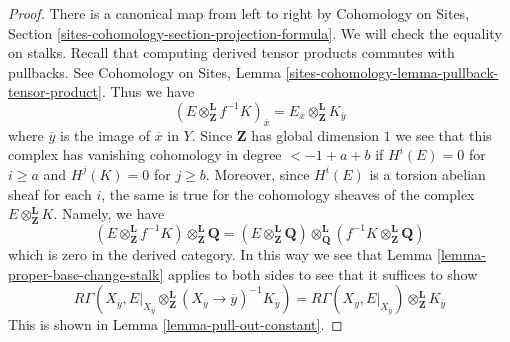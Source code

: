 \documentclass[10pt,a4paper]{amsart}
\theoremstyle{plain}
\theoremstyle{definition}
\theoremstyle{remark}
\numberwithin{equation}{subsection}
\begin{document}
\begin{proof}
There is a canonical map from left to right by
Cohomology on Sites, Section \ref{sites-cohomology-section-projection-formula}.
We will check the equality on stalks.
Recall that computing derived tensor products commutes with pullbacks.
See Cohomology on Sites, Lemma
\ref{sites-cohomology-lemma-pullback-tensor-product}.
Thus we have
$$
(E \otimes_\mathbf{Z}^\mathbf{L} f^{-1}K)_{\overline{x}}
=
E_{\overline{x}} \otimes_\mathbf{Z}^\mathbf{L} K_{\overline{y}}
$$
where $\overline{y}$ is the image of $\overline{x}$ in $Y$.
Since $\mathbf{Z}$ has global dimension $1$ we see that
this complex has vanishing cohomology in degree $< - 1 + a + b$
if $H^i(E) = 0$ for $i \geq a$ and $H^j(K) = 0$ for $j \geq b$.
Moreover, since $H^i(E)$ is a torsion abelian
sheaf for each $i$, the same is true for the cohomology
sheaves of the complex $E \otimes_\mathbf{Z}^\mathbf{L} K$.
Namely, we have
$$
(E \otimes_\mathbf{Z}^\mathbf{L} f^{-1}K)
\otimes_{\mathbf{Z}}^\mathbf{L} \mathbf{Q} =
(E \otimes_\mathbf{Z}^\mathbf{L} \mathbf{Q})
\otimes_{\mathbf{Q}}^\mathbf{L}
(f^{-1}K \otimes_{\mathbf{Z}}^\mathbf{L} \mathbf{Q})
$$
which is zero in the derived category.
In this way we see that Lemma \ref{lemma-proper-base-change-stalk}
applies to both sides to see that it suffices to show
$$
R\Gamma(X_{\overline{y}},
E|_{X_{\overline{y}}} \otimes_\mathbf{Z}^\mathbf{L}
(X_{\overline{y}} \to \overline{y})^{-1}K_{\overline{y}}) =
R\Gamma(X_{\overline{y}},
E|_{X_{\overline{y}}}) \otimes_\mathbf{Z}^\mathbf{L} K_{\overline{y}}
$$
This is shown in Lemma \ref{lemma-pull-out-constant}.
\end{proof}
\end{document}
